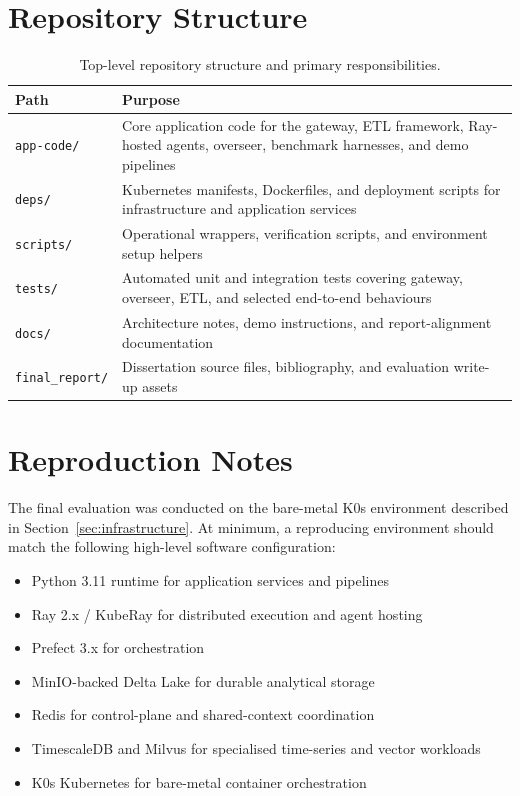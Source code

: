 \documentclass[12pt, a4paper]{report}
\begin{document}
\section{Repository Structure}
\label{app:repo_structure}

\begin{table}[H]
  \centering
  \caption{Top-level repository structure and primary responsibilities.}
  \label{tab:repo_structure}
  \begin{tabularx}{\textwidth}{lX}
    \toprule
    \textbf{Path} & \textbf{Purpose} \\
    \midrule
    \texttt{app-code/} & Core application code for the gateway, ETL framework, Ray-hosted agents, overseer, benchmark harnesses, and demo pipelines \\
    \texttt{deps/} & Kubernetes manifests, Dockerfiles, and deployment scripts for infrastructure and application services \\
    \texttt{scripts/} & Operational wrappers, verification scripts, and environment setup helpers \\
    \texttt{tests/} & Automated unit and integration tests covering gateway, overseer, ETL, and selected end-to-end behaviours \\
    \texttt{docs/} & Architecture notes, demo instructions, and report-alignment documentation \\
    \texttt{final\_report/} & Dissertation source files, bibliography, and evaluation write-up assets \\
    \bottomrule
  \end{tabularx}
\end{table}

\section{Reproduction Notes}
\label{app:repro}

The final evaluation was conducted on the bare-metal K0s environment described in
Section~\ref{sec:infrastructure}. At minimum, a reproducing environment should match
the following high-level software configuration:

\begin{itemize}
  \item Python 3.11 runtime for application services and pipelines
  \item Ray 2.x / KubeRay for distributed execution and agent hosting
  \item Prefect 3.x for orchestration
  \item MinIO-backed Delta Lake for durable analytical storage
  \item Redis for control-plane and shared-context coordination
  \item TimescaleDB and Milvus for specialised time-series and vector workloads
  \item K0s Kubernetes for bare-metal container orchestration
\end{itemize}
\end{document}
